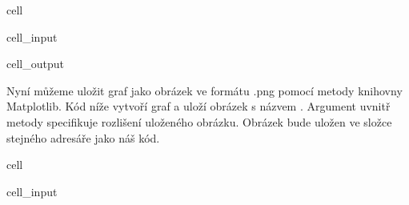\documentclass[letterpaper,10pt,english]{jupyterBook}
\begin{document}
{{\begin{sphinxuseclass}{cell}
\begin{sphinxVerbatimInput}
\begin{sphinxuseclass}{cell_input}
\begin{sphinxVerbatim}[commandchars=\\\{\}]
\PYG{p}{[}\PYG{p}{]}

\end{sphinxVerbatim}

\end{sphinxuseclass}\end{sphinxVerbatimInput}
\begin{sphinxVerbatimOutput}

\begin{sphinxuseclass}{cell_output}
\noindent{}

\end{sphinxuseclass}\end{sphinxVerbatimOutput}

\end{sphinxuseclass}
\sphinxAtStartPar
Nyní můžeme uložit graf jako obrázek ve formátu .png pomocí metody  knihovny Matplotlib. Kód níže vytvoří graf a uloží obrázek s názvem . Argument  uvnitř metody  specifikuje rozlišení uloženého obrázku. Obrázek bude uložen ve složce  stejného adresáře jako náš kód.

\begin{sphinxuseclass}{cell}\begin{sphinxVerbatimInput}

\begin{sphinxuseclass}{cell_input}
\begin{sphinxVerbatim}[commandchars=\\\{\}]
  


\end{sphinxVerbatim}
\end{sphinxuseclass}
\end{sphinxVerbatimInput}
\end{sphinxuseclass}}}
\end{document}
